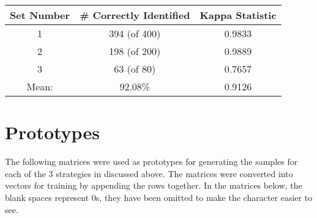 \documentclass{article}
\begin{document}
			\begin{minipage}{\linewidth}
				\centering
				\begin{tabular}{c|cc}\label{RBFAcc}
					Set Number 	& \# Correctly Identified	& Kappa Statistic \\
					\hline
					1			&  394 (of 400)		 		&	0.9833						 \\
					2			&  198 (of 200)		 		&	0.9889				 \\ 
					3			&  63 (of 80)		 		&	0.7657					 \\
					\hline
					Mean: & 92.08\% &0.9126
				\end{tabular}
			\end{minipage}
	
	\section{Prototypes}\label{S6}
	The following matrices were used as prototypes for generating the samples for each of the 3 strategies in discussed above. The matrices were converted into vectors for training by appending the rows together. In the matrices below, the blank spaces represent 0s, they have been omitted to make the character easier to see. 
	
\end{document}

